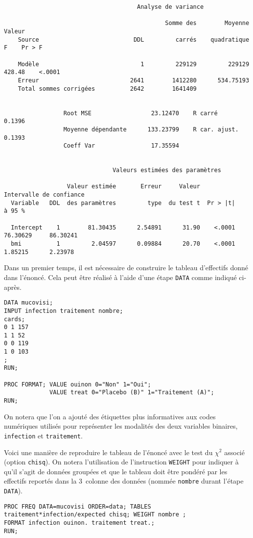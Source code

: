 \begin{verbatim}
                                      Analyse de variance

                                              Somme des        Moyenne     Valeur
    Source                           DDL         carrés    quadratique          F    Pr > F

    Modèle                             1         229129         229129     428.48    <.0001
    Erreur                          2641        1412280      534.75193
    Total sommes corrigées          2642        1641409


                 Root MSE                 23.12470    R carré           0.1396
                 Moyenne dépendante      133.23799    R car. ajust.     0.1393
                 Coeff Var                17.35594


                               Valeurs estimées des paramètres

                  Valeur estimée       Erreur     Valeur             Intervalle de confiance
  Variable   DDL  des paramètres         type  du test t  Pr > |t|           à 95 %

  Intercept    1        81.30435      2.54891      31.90    <.0001     76.30629     86.30241
  bmi          1         2.04597      0.09884      20.70    <.0001      1.85215      2.23978
\end{verbatim}

\soln{\ref{exo:10.4}} Dans un premier temps, il est nécessaire de construire
le tableau d'effectifs donné dans l'énoncé. Cela peut être réalisé à l'aide
d'une étape \texttt{DATA} comme indiqué ci-après.
\begin{verbatim}
DATA mucovisi;
INPUT infection traitement nombre;
cards;
0 1 157
1 1 52
0 0 119
1 0 103
;
RUN;

PROC FORMAT; VALUE ouinon 0="Non" 1="Oui";
             VALUE treat 0="Placebo (B)" 1="Traitement (A)";
RUN;
\end{verbatim}
On notera que l'on a ajouté des étiquettes plus informatives aux codes
numériques utilisés pour représenter les modalités des deux variables
binaires, \texttt{infection} et \texttt{traitement}.

Voici une manière de reproduire le tableau de l'énoncé avec le test du
$\chi^2$ associé (option \texttt{chisq}). On notera l'utilisation de
l'instruction \texttt{WEIGHT} pour indiquer à \SAS qu'il s'agit de données
groupées et que le tableau doit être pondéré par les effectifs reportés dans
la 3\ieme\ colonne des données (nommée \texttt{nombre} durant l'étape
\texttt{DATA}).
\begin{verbatim}
PROC FREQ DATA=mucovisi ORDER=data; TABLES traitement*infection/expected chisq; WEIGHT nombre ;
FORMAT infection ouinon. traitement treat.;
RUN;
\end{verbatim}

